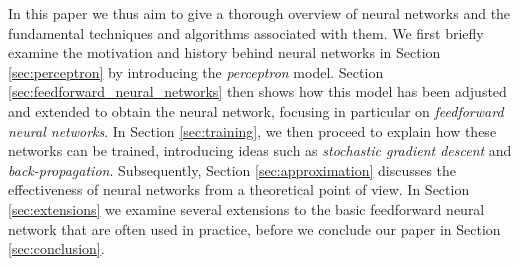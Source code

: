 In this paper we thus aim to give a thorough overview of neural networks and the fundamental techniques and algorithms associated with them. We first briefly examine the motivation and history behind neural networks in Section \ref{sec:perceptron} by introducing the \textit{perceptron} model. Section \ref{sec:feedforward_neural_networks} then shows how this model has been adjusted and extended to obtain the neural network, focusing in particular on \textit{feedforward neural networks}. In Section \ref{sec:training}, we then proceed to explain how these networks can be trained, introducing ideas such as \textit{stochastic gradient descent} and \textit{back-propagation}. Subsequently, Section \ref{sec:approximation} discusses the effectiveness of neural networks from a theoretical point of view. In Section \ref{sec:extensions} we examine several extensions to the basic feedforward neural network that are often used in practice, before we conclude our paper in Section \ref{sec:conclusion}.
